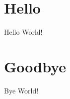 \documentclass{article}
\begin{document}
    \section{Hello}
        Hello World!
    
    \section{Goodbye}
        Bye World!
\end{document}
